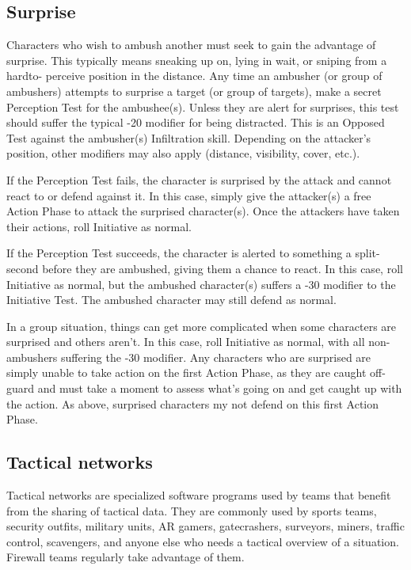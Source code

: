 \subsection{Surprise}
\label{sec:surprise}

Characters who wish to ambush another must seek to gain the advantage of surprise. This typically means sneaking up on, lying in wait, or sniping from a hardto- perceive position in the distance. Any time an ambusher (or group of ambushers) attempts to surprise a target (or group of targets), make a secret Perception Test for the ambushee(s). Unless they are alert for surprises, this test should suffer the typical -20 modifier for being distracted. This is an Opposed Test against the ambusher(s) Infiltration skill. Depending on the attacker’s position, other modifiers may also apply (distance, visibility, cover, etc.).

If the Perception Test fails, the character is surprised by the attack and cannot react to or defend against it. In this case, simply give the attacker(s) a free Action Phase to attack the surprised character(s). Once the attackers have taken their actions, roll Initiative as normal.

If the Perception Test succeeds, the character is alerted to something a split-second before they are ambushed, giving them a chance to react. In this case, roll Initiative as normal, but the ambushed character(s) suffers a -30 modifier to the Initiative Test. The ambushed character may still defend as normal.

In a group situation, things can get more complicated when some characters are surprised and others aren’t. In this case, roll Initiative as normal, with all non-ambushers suffering the -30 modifier. Any characters who are surprised are simply unable to take action on the first Action Phase, as they are caught off-guard and must take a moment to assess what’s going on and get caught up with the action. As above, surprised characters my not defend on this first Action Phase.


\subsection{Tactical networks}
\label{sec:tactical-networks}

Tactical networks are specialized software programs used by teams that benefit from the sharing of tactical data. They are commonly used by sports teams, security outfits, military units, AR gamers, gatecrashers, surveyors, miners, traffic control, scavengers, and anyone else who needs a tactical overview of a situation. Firewall teams regularly take advantage of them.

